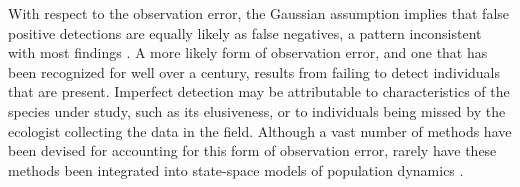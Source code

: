 \documentclass[12pt]{article}
\begin{document}
With respect to the observation error, the Gaussian assumption
implies that false positive detections are
equally likely as false negatives, a pattern inconsistent with most
findings \citep{miller_etal:2011}. 
A more likely form of observation error, and one that has been recognized for well
over a century, results from failing to detect individuals that are
present. Imperfect detection may be attributable to
characteristics of the species under study, such as its elusiveness,
or to individuals being missed by the ecologist collecting the data in the field.
Although a vast number of methods have been devised for accounting for
this form of observation error, rarely have these methods been
integrated into state-space models of population dynamics \citep[but
see][]{buckland_etal:2004}.
\end{document}
